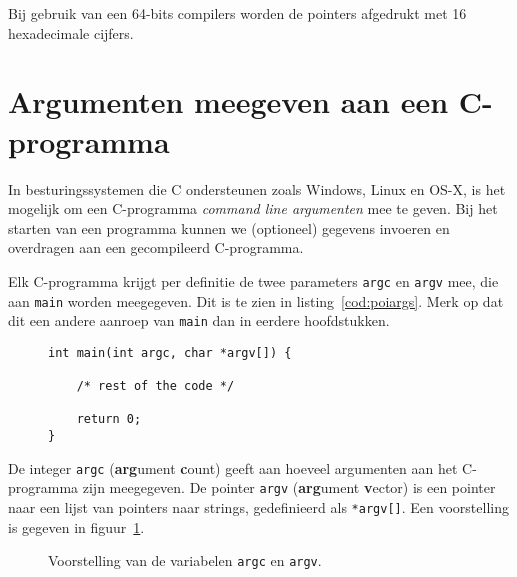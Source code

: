 Bij gebruik van een 64-bits compilers worden de pointers afgedrukt met 16 hexadecimale cijfers.


\section{Argumenten meegeven aan een C-programma}
\label{sec:argumentenmeegevenaaneencprogramma}
In besturingssystemen die C ondersteunen zoals Windows, Linux en OS-X, is het mogelijk om een C-programma \textsl{command line argumenten} mee te geven. Bij het starten van een programma kunnen we (optioneel) gegevens invoeren en overdragen aan een gecompileerd C-programma.

Elk C-programma krijgt per definitie de twee parameters \texttt{argc} en \texttt{argv} mee, die aan \texttt{main} worden meegegeven. Dit is te zien in listing~\ref{cod:poiargs}. Merk op dat dit een andere aanroep van \lstinline|main| dan in eerdere hoofdstukken.

\begin{figure}[!ht]
\begin{lstlisting}[caption=Definitie van de command line parameters.,label=cod:poiargs]
int main(int argc, char *argv[]) {

    /* rest of the code */
    
    return 0;
}
\end{lstlisting}
\end{figure}

De integer \texttt{argc} (\textbf{arg}ument \textbf{c}ount) geeft aan hoeveel argumenten aan het C-programma zijn meegegeven. De pointer \texttt{argv} (\textbf{arg}ument \textbf{v}ector) is  een pointer naar een lijst van pointers naar strings, gedefinieerd als \texttt{*argv[]}. 
Een voorstelling is gegeven in figuur~\ref{fig:poiargcargv}.

\begin{figure}[!ht]
\centering
{}
\caption{Voorstelling van de variabelen \texttt{argc} en \texttt{argv}.}
\label{fig:poiargcargv}
\end{figure}


